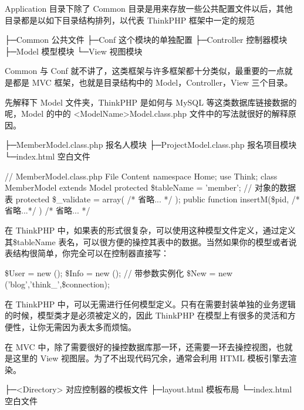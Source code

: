 Application 目录下除了 Common 目录是用来存放一些公共配置文件以后，其他目录都是以如下目录结构排列，以代表 ThinkPHP 框架中一定的规范

\begin{code}
├─Common       公共文件
├─Conf         这个模块的单独配置
├─Controller   控制器模块
├─Model        模型模块
└─View         视图模块
\end{code}

Common 与 Conf 就不讲了，这类框架与许多框架都十分类似，最重要的一点就是都是 MVC 框架，也就是目录结构中的 Model，Controller，View 三个目录。

先解释下 Model 文件夹，ThinkPHP 是如何与 MySQL 等这类数据库链接数据的呢，Model 的中的 <ModelName>Model.class.php 文件中的写法就很好的解释原因。

\begin{code}
├─MemberModel.class.php    报名人模块
├─ProjectModel.class.php   报名项目模块
└─index.html               空白文件
\end{code}

\begin{code}
// MemberModel.class.php File Content
namespace Home\Model;
use Think\Model;
class MemberModel extends Model{
    protected \$tableName = 'member'; // 对象的数据表
    protected \$_validate = array( /* 省略... */ );
    public function insertM(\$pid, /*省略...*/ )
    { /* 省略... */ }
}
\end{code}

在 ThinkPHP 中，如果表的形式很复杂，可以使用这种模型文件定义，通过定义其\$tableName 表名，可以很方便的操控其表中的数据。当然如果你的模型或者说表结构很简单，你完全可以在控制器直接写：

\begin{code}
\$User = new \Home\Model\UserModel();
\$Info = new \Admin\Model\InfoModel();
// 带参数实例化
\$New  = new \Home\Model\NewModel('blog','think_',\$connection);
\end{code}

在 ThinkPHP 中，可以无需进行任何模型定义。只有在需要封装单独的业务逻辑的时候，模型类才是必须被定义的，因此 ThinkPHP 在模型上有很多的灵活和方便性，让你无需因为表太多而烦恼。

在 MVC 中，除了需要很好的操控数据库那一环，还需要一环去操控视图，也就是这里的 View 视图层。为了不出现代码冗余，通常会利用 HTML 模板引擎去渲染。

\begin{code}
├─<Directory>   对应控制器的模板文件
├─layout.html   模板布局
└─index.html    空白文件
\end{code}


